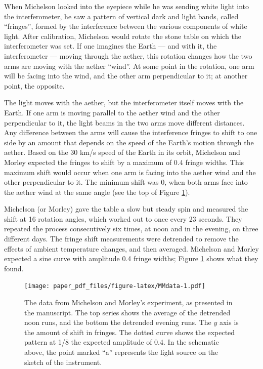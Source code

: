 \documentclass[english,floatsintext,man]{apa6}
\theoremstyle{definition}
\theoremstyle{definition}
\theoremstyle{definition}
\theoremstyle{remark}
\begin{document}
When Michelson looked into the eyepiece while he was sending white light
into the interferometer, he saw a pattern of vertical dark and light
bands, called \enquote{fringes}, formed by the interference between the
various components of white light. After calibration, Michelson would
rotate the stone table on which the interferometer was set. If one
imagines the Earth --- and with it, the interferometer --- moving
through the aether, this rotation changes how the two arms are moving
with the aether \enquote{wind}. At some point in the rotation, one arm
will be facing into the wind, and the other arm perpendicular to it; at
another point, the opposite.

The light moves with the aether, but the interferometer itself moves
with the Earth. If one arm is moving parallel to the aether wind and the
other perpendicular to it, the light beams in the two arms move
different distances. Any difference between the arms will cause the
interference fringes to shift to one side by an amount that depends on
the speed of the Earth's motion through the aether. Based on the 30 km/s
speed of the Earth in its orbit, Michelson and Morley expected the
fringes to shift by a maximum of 0.4 fringe widths. This maximum shift
would occur when one arm is facing into the aether wind and the other
perpendicular to it. The minimum shift was 0, when both arms face into
the aether wind at the same angle (see the top of Figure
\ref{fig:MMdata}).

Michelson (or Morley) gave the table a slow but steady spin and measured
the shift at 16 rotation angles, which worked out to once every 23
seconds. They repeated the process consecutively six times, at noon and
in the evening, on three different days. The fringe shift measurements
were detrended to remove the effects of ambient temperature changes, and
then averaged. Michelson and Morley expected a sine curve with amplitude
0.4 fringe widths; Figure \ref{fig:MMdata} shows what they found.

\begin{figure}
\centering
\texttt{[image: paper\_pdf\_files/figure-latex/MMdata-1.pdf]}
\caption{\label{fig:MMdata}The data from Michelson and Morley's experiment,
as presented in the manuscript. The top series shows the average of the
detrended noon runs, and the bottom the detrended evening runs. The
\(y\) axis is the amount of shift in fringes. The dotted curve shows the
expected pattern at 1/8 the expected amplitude of 0.4. In the schematic
above, the point marked \enquote{a} represents the light source on the
sketch of the instrument.}
\end{figure}
\end{document}
